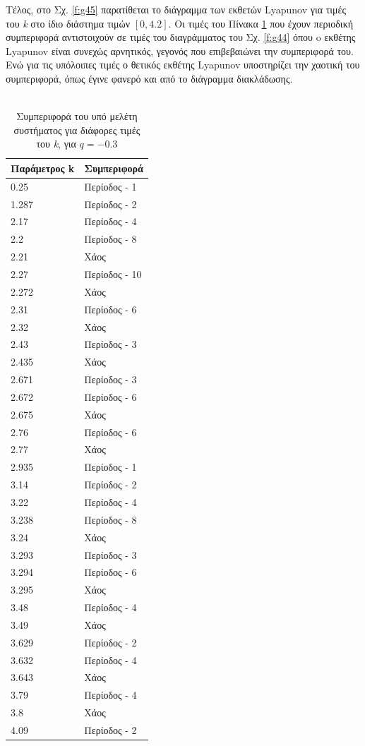Τέλος, στο Σχ. \ref{f:g45} παρατίθεται το διάγραμμα των εκθετών Lyapunov για τιμές του \emph{k} στο ίδιο διάστημα τιμών $[0, 4.2]$. Οι τιμές του Πίνακα \ref{tab:abc10} που έχουν περιοδική συμπεριφορά αντιστοιχούν σε τιμές του διαγράμματος του Σχ. \ref{f:g44} όπου o εκθέτης Lyapunov είναι συνεχώς αρνητικός, γεγονός που επιβεβαιώνει την συμπεριφορά του. Ενώ για τις υπόλοιπες τιμές ο θετικός εκθέτης Lyapunov υποστηρίζει την χαοτική του συμπεριφορά, όπως έγινε φανερό και από το διάγραμμα διακλάδωσης.\\\\





\begin{table}[ht]
	\centering
	\caption{ Συμπεριφορά του υπό μελέτη συστήματος για διάφορες τιμές του \emph{k}, για $q=-0.3$ }
	\label{tab:abc10}
	\begin{tabular}{l | l}
		Παράμετρος k & Συμπεριφορά \\
		\hline
		0.25 &  Περίοδος -  1 \\
		1.287 &  Περίοδος -  2 \\
		2.17& Περίοδος -  4 \\
		2.2& Περίοδος -  8 \\
		2.21 & Xάος \\
		2.27& Περίοδος - 10 \\
		2.272& Χάος \\
		2.31& Περίοδος - 6 \\
		2.32 &  Χάος \\
		2.43 &  Περίοδος -  3 \\
		2.435 &  Χάος \\
		2.671 &  Περίοδος -  3\\
		2.672 & Περίοδος - 6\\
		2.675 & Χάος\\
		2.76 &Περίοδος - 6 \\
		2.77& Χάος\\
		2.935 & Περίοδος -  1\\
		3.14& Περίοδος - 2\\
		3.22 & Περίοδος -  4\\
		3.238 & Περίοδος -  8\\
		3.24 & Χάος\\
		3.293 & Περίοδος -  3\\
		3.294 & Περίοδος -  6\\
		3.295 & Χάος\\
		3.48& Περίοδος -  4\\
		3.49 & Χάος\\
		3.629 &  Περίοδος -  2\\
		3.632 &  Περίοδος -  4 \\
		3.643 & Χάος\\
		3.79 & Περίοδος -  4\\
		3.8 & Χάος\\
		4.09 & Περίοδος -  2\\
		
		
	\end{tabular}
	
\end{table}



